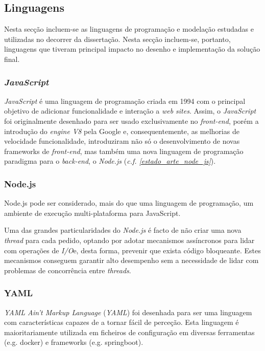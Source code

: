 \subsection{Linguagens}
Nesta secção incluem-se as linguagens de programação e modelação estudadas e utilizadas no decorrer da dissertação. Nesta secção incluem-se, portanto, linguagens que tiveram principal impacto no desenho e implementação da solução final.

\subsubsection{\emph{JavaScript} \label{estado_arte_javascript}}

\emph{JavaScript} é uma linguagem de programação criada em 1994 com o principal objetivo de adicionar funcionalidade e interação a \emph{web sites}. Assim, o \emph{JavaScript} foi originalmente desenhado para ser usado exclusivamente no \emph{front-end}, porém a introdução do \emph{engine V8} pela Google e, consequentemente, as melhorias de velocidade funcionalidade, introduziram não só o desenvolvimento de novas frameworks de \emph{front-end}, mas também uma nova linguagem de programação paradigma para o \emph{back-end}, o \emph{Node.js} (\emph{c.f. \ref{estado_arte_node_js}})\cite{javascript}.

\subsubsection{Node.js \label{estado_arte_node_js}}
Node.js pode ser considerado, mais do que uma linguagem de programação, um ambiente de execução multi-plataforma para JavaScript\cite{node_js}.

Uma das grandes particularidades do \emph{Node.js} é facto de não criar uma nova \emph{thread} para cada pedido, optando por adotar mecanismos assíncronos para lidar com operações de \emph{I/O}e, desta forma, prevenir que exista código bloqueante. Estes mecanismos conseguem garantir alto desempenho sem a necessidade de lidar com problemas de concorrência entre \emph{threads}\cite{node_js}.

\subsubsection{YAML}
\emph{YAML Ain't Markup Language} (\emph{YAML\label{sym:YAML}}) foi desenhada para ser uma linguagem com características capazes de a tornar fácil de perceção. Esta linguagem é maioritariamente utilizada em ficheiros de configuração em diversas ferramentas (e.g. docker) e frameworks (e.g. springboot)\cite{yaml}.


